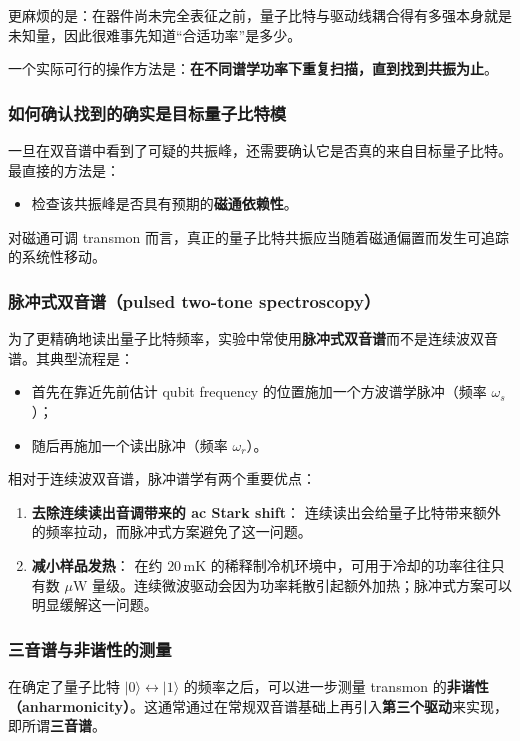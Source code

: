 \documentclass[12pt,a4paper,oneside]{ctexbook}
\begin{document}
更麻烦的是：在器件尚未完全表征之前，量子比特与驱动线耦合得有多强本身就是未知量，因此很难事先知道“合适功率”是多少。

一个实际可行的操作方法是：\textbf{在不同谱学功率下重复扫描，直到找到共振为止}。

\subsubsection{如何确认找到的确实是目标量子比特模}

一旦在双音谱中看到了可疑的共振峰，还需要确认它是否真的来自目标量子比特。最直接的方法是：
\begin{itemize}
    \item 检查该共振峰是否具有预期的\textbf{磁通依赖性}。
\end{itemize}

对磁通可调 transmon 而言，真正的量子比特共振应当随着磁通偏置而发生可追踪的系统性移动。

\subsubsection{脉冲式双音谱（pulsed two-tone spectroscopy）}

为了更精确地读出量子比特频率，实验中常使用\textbf{脉冲式双音谱}而不是连续波双音谱。其典型流程是：
\begin{itemize}
    \item 首先在靠近先前估计 qubit frequency 的位置施加一个方波谱学脉冲（频率 \(\omega_s\)）；
    \item 随后再施加一个读出脉冲（频率 \(\omega_r\)）。
\end{itemize}

相对于连续波双音谱，脉冲谱学有两个重要优点：
\begin{enumerate}
    \item \textbf{去除连续读出音调带来的 ac Stark shift}：
    连续读出会给量子比特带来额外的频率拉动，而脉冲式方案避免了这一问题。
    \item \textbf{减小样品发热}：
    在约 \(20\,\mathrm{mK}\) 的稀释制冷机环境中，可用于冷却的功率往往只有数 \(\mu\mathrm{W}\) 量级。连续微波驱动会因为功率耗散引起额外加热；脉冲式方案可以明显缓解这一问题。
\end{enumerate}

\subsubsection{三音谱与非谐性的测量}

在确定了量子比特 \(|0\rangle \leftrightarrow |1\rangle\) 的频率之后，可以进一步测量 transmon 的\textbf{非谐性（anharmonicity）}。这通常通过在常规双音谱基础上再引入\textbf{第三个驱动}来实现，即所谓\textbf{三音谱}。
\end{document}
